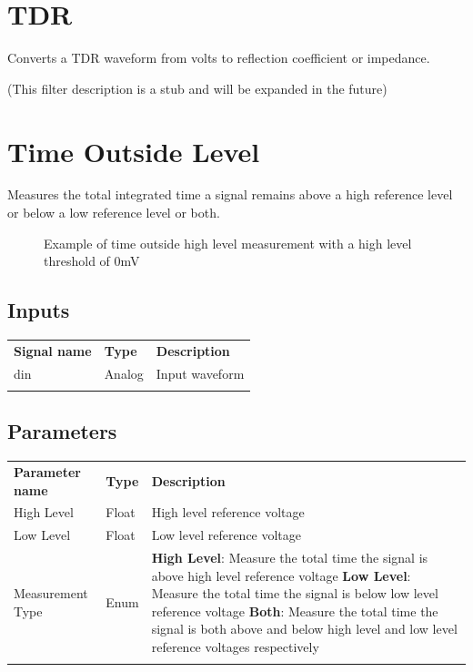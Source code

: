\pagebreak
\section{TDR}

Converts a TDR waveform from volts to reflection coefficient or impedance.

(This filter description is a stub and will be expanded in the future)

\pagebreak
\section{Time Outside Level}

Measures the total integrated time a signal remains above a high reference level or below a low reference level or both.

\begin{figure}[h]
	\centering
	\caption{Example of time outside high level measurement with a high level threshold of 0mV}
	\label{filter_timeoutsidelevel}
	\end{figure}

\subsection{Inputs}

\begin{tabularx}{16cm}{llX}
\thickhline
\textbf{Signal name} & \textbf{Type} & \textbf{Description} \\
\thickhline
din & Analog & Input waveform \\
\thickhline
\end{tabularx}

\subsection{Parameters}

\begin{tabularx}{16cm}{llX}
\thickhline
\textbf{Parameter name} & \textbf{Type} & \textbf{Description} \\
\thickhline
High Level & Float & High level reference voltage\\
\thinhline
Low Level & Float & Low level reference voltage\\
\thinhline
Measurement Type & Enum &
	\textbf{High Level}: Measure the total time the signal is above high level reference voltage \newline
	\textbf{Low Level}: Measure the total time the signal is below low level reference voltage \newline
	\textbf{Both}: Measure the total time the signal is both above and below high level and low level reference voltages respectively\\
\thickhline
\end{tabularx}

